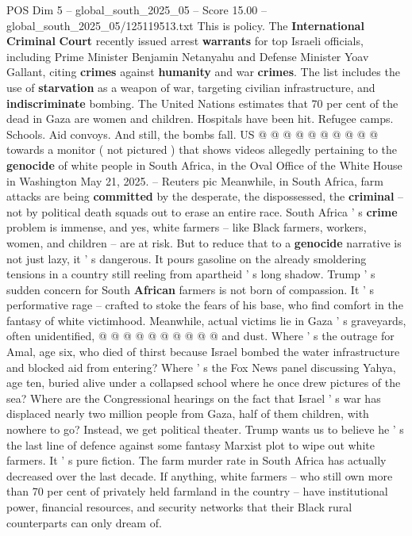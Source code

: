 \begin{textsample}{POS Dim 5 – global\_south\_2025\_05 – Score 15.00 – global\_south\_2025\_05/125119513.txt}
This is policy.
The \textbf{International} \textbf{Criminal} \textbf{Court} recently issued arrest \textbf{warrants} for top Israeli officials, including Prime Minister Benjamin Netanyahu and Defense Minister Yoav Gallant, citing \textbf{crimes} against \textbf{humanity} and war \textbf{crimes}.
The list includes the use of \textbf{starvation} as a weapon of war, targeting civilian infrastructure, and \textbf{indiscriminate} bombing.
The United Nations estimates that 70 per cent of the dead in Gaza are women and children.
Hospitals have been hit.
Refugee camps.
Schools.
Aid convoys.
And still, the bombs fall.
US @ @ @ @ @ @ @ @ @ @ towards a monitor ( not pictured ) that shows videos allegedly pertaining to the \textbf{genocide} of white people in South Africa, in the Oval Office of the White House in Washington May 21, 2025. -- Reuters pic Meanwhile, in South Africa, farm attacks are being \textbf{committed} by the desperate, the dispossessed, the \textbf{criminal} -- not by political death squads out to erase an entire race.
South Africa ' s \textbf{crime} problem is immense, and yes, white farmers -- like Black farmers, workers, women, and children -- are at risk.
But to reduce that to a \textbf{genocide} narrative is not just lazy, it ' s dangerous.
It pours gasoline on the already smoldering tensions in a country still reeling from apartheid ' s long shadow.
Trump ' s sudden concern for South \textbf{African} farmers is not born of compassion.
It ' s performative rage -- crafted to stoke the fears of his base, who find comfort in the fantasy of white victimhood.
Meanwhile, actual victims lie in Gaza ' s graveyards, often unidentified, @ @ @ @ @ @ @ @ @ @ and dust.
Where ' s the outrage for Amal, age six, who died of thirst because Israel bombed the water infrastructure and blocked aid from entering?
Where ' s the Fox News panel discussing Yahya, age ten, buried alive under a collapsed school where he once drew pictures of the sea?
Where are the Congressional hearings on the fact that Israel ' s war has displaced nearly two million people from Gaza, half of them children, with nowhere to go?
Instead, we get political theater.
Trump wants us to believe he ' s the last line of defence against some fantasy Marxist plot to wipe out white farmers.
It ' s pure fiction.
The farm murder rate in South Africa has actually decreased over the last decade.
If anything, white farmers -- who still own more than 70 per cent of privately held farmland in the country -- have institutional power, financial resources, and security networks that their Black rural counterparts can only dream of.

\end{textsample}
